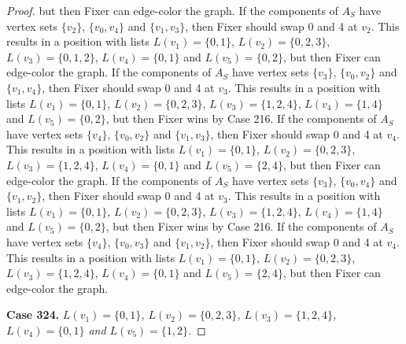 \documentclass[12pt]{amsart}
\theoremstyle{plain}
\theoremstyle{definition}
\theoremstyle{remark}
\begin{document}
\begin{proof}
but then Fixer can edge-color the graph. If the components of $A_S$ have vertex sets $\{v_2\}$, $\{v_0, v_4\}$ and $\{v_1, v_3\}$, then Fixer should swap 0 and 4 at $v_2$. This results in a position with lists $L(v_1) = \{0, 1\}$, $L(v_2) = \{0, 2, 3\}$, $L(v_3) = \{0, 1, 2\}$, $L(v_4) = \{0, 1\}$ and $L(v_5) = \{0, 2\}$, but then Fixer can edge-color the graph. If the components of $A_S$ have vertex sets $\{v_3\}$, $\{v_0, v_2\}$ and $\{v_1, v_4\}$, then Fixer should swap 0 and 4 at $v_3$. This results in a position with lists $L(v_1) = \{0, 1\}$, $L(v_2) = \{0, 2, 3\}$, $L(v_3) = \{1, 2, 4\}$, $L(v_4) = \{1, 4\}$ and $L(v_5) = \{0, 2\}$, but then Fixer wins by Case 216. If the components of $A_S$ have vertex sets $\{v_4\}$, $\{v_0, v_2\}$ and $\{v_1, v_3\}$, then Fixer should swap 0 and 4 at $v_4$. This results in a position with lists $L(v_1) = \{0, 1\}$, $L(v_2) = \{0, 2, 3\}$, $L(v_3) = \{1, 2, 4\}$, $L(v_4) = \{0, 1\}$ and $L(v_5) = \{2, 4\}$, but then Fixer can edge-color the graph. If the components of $A_S$ have vertex sets $\{v_3\}$, $\{v_0, v_4\}$ and $\{v_1, v_2\}$, then Fixer should swap 0 and 4 at $v_3$. This results in a position with lists $L(v_1) = \{0, 1\}$, $L(v_2) = \{0, 2, 3\}$, $L(v_3) = \{1, 2, 4\}$, $L(v_4) = \{1, 4\}$ and $L(v_5) = \{0, 2\}$, but then Fixer wins by Case 216. If the components of $A_S$ have vertex sets $\{v_4\}$, $\{v_0, v_3\}$ and $\{v_1, v_2\}$, then Fixer should swap 0 and 4 at $v_4$. This results in a position with lists $L(v_1) = \{0, 1\}$, $L(v_2) = \{0, 2, 3\}$, $L(v_3) = \{1, 2, 4\}$, $L(v_4) = \{0, 1\}$ and $L(v_5) = \{2, 4\}$, but then Fixer can edge-color the graph. 

\noindent\textbf{Case 324.  }\textit{$L(v_1) = \{0, 1\}$, $L(v_2) = \{0, 2, 3\}$, $L(v_3) = \{1, 2, 4\}$, $L(v_4) = \{0, 1\}$ and $L(v_5) = \{1, 2\}$.}


\end{proof}
\end{document}
